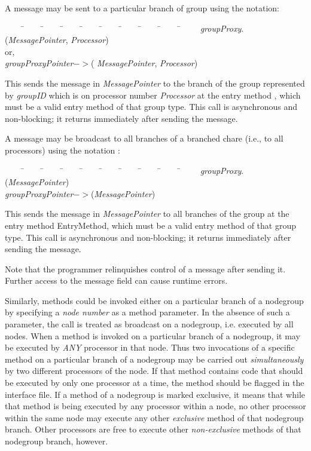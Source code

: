 A message may be sent to a particular branch of group using the
notation:

\begin{tabbing} ~~~~ \=~~~~ \=~~~~ \=~~~~ \=~~~~ \=~~~~ \=~~~~ \=~~~~ \=~~~~
\=~~~~ \kill \> {\it groupProxy}$.$({\it MessagePointer}, {\it
Processor}) \\ \> \> or, \\ \> {\it groupProxyPointer}$->$({\it
MessagePointer}, {\it Processor}) \end{tabbing}

This sends the message in {\it MessagePointer} to the branch of
the group represented by {\it groupID} which is on processor number {\it
Processor} at the entry method , which must be a valid entry
method of that group type. This call is asynchronous and non-blocking; it
returns immediately after sending the message.

A message may be broadcast  to all branches of a branched
chare (i.e., to all processors) using the notation :

\begin{tabbing} ~~~~ \=~~~~ \=~~~~ \=~~~~ \=~~~~ \=~~~~ \=~~~~ \=~~~~ \=~~~~
\=~~~~ \kill \> {\it groupProxy}$.$({\it MessagePointer}) \\ \>
{\it groupProxyPointer}$->$({\it MessagePointer}) \end{tabbing}

This sends the message in {\it MessagePointer} to all branches of the group at
the entry method {\sf EntryMethod}, which must be a valid entry method of that
group type. This call is asynchronous and non-blocking; it returns immediately
after sending the message.

Note that the programmer relinquishes control of a message after sending it.
Further access to the message field can cause runtime errors.

Similarly, methods could be invoked either on a particular branch
of a nodegroup by specifying a {\em node number} as a method
parameter. In the absence of such a parameter, the call is treated as broadcast
on a nodegroup, i.e. executed by all nodes. When a method is
invoked on a particular branch of a nodegroup,
it may be executed by {\em ANY} processor in that node. Thus two invocations of
a specific method on a particular branch of a
nodegroup may be carried out {\em simultaneously} by two
different processors of the node. If that method contains code that
should be executed by only one processor at a time, the method should
be flagged
 in the interface file. If a method  of a
nodegroup  is marked exclusive, it means that while that method is being
executed by any processor within a node, no other processor within the same
node may execute any other {\em exclusive} method of that
nodegroup branch.  Other processors are free to
execute other {\em non-exclusive} methods of that nodegroup
branch, however.

